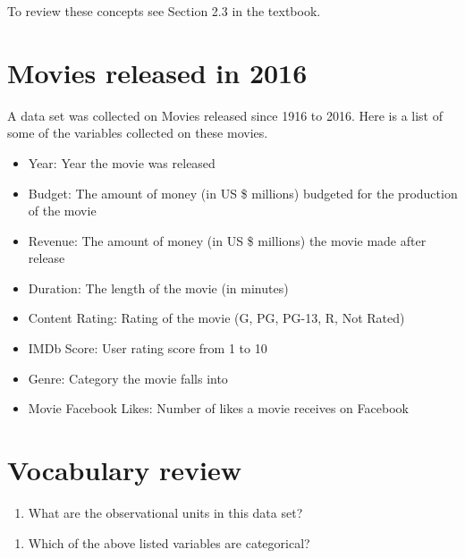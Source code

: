 \documentclass[
]{report}
\providecommand{\tightlist}{%
  \setlength{\itemsep}{0pt}\setlength{\parskip}{0pt}}
\begin{document}
To review these concepts see Section 2.3 in the textbook.

\hypertarget{movies-released-in-2016}{%
\section{Movies released in 2016}\label{movies-released-in-2016}}

A data set was collected on Movies released since 1916 to 2016. Here is a list of some of the variables collected on these movies.

\begin{itemize}
\item
  Year: Year the movie was released
\item
  Budget: The amount of money (in US \$ millions) budgeted for the production of the movie
\item
  Revenue: The amount of money (in US \$ millions) the movie made after release
\item
  Duration: The length of the movie (in minutes)
\item
  Content Rating: Rating of the movie (G, PG, PG-13, R, Not Rated)
\item
  IMDb Score: User rating score from 1 to 10
\item
  Genre: Category the movie falls into
\item
  Movie Facebook Likes: Number of likes a movie receives on Facebook
\end{itemize}

\newpage

\hypertarget{vocabulary-review}{%
\section{Vocabulary review}\label{vocabulary-review}}

\begin{enumerate}
\def\labelenumi{\arabic{enumi}.}
\tightlist
\item
  What are the observational units in this data set?
\end{enumerate}

\vspace{0.3in}

\begin{enumerate}
\def\labelenumi{\arabic{enumi}.}
\setcounter{enumi}{1}
\tightlist
\item
  Which of the above listed variables are categorical?
\end{enumerate}
\end{document}

